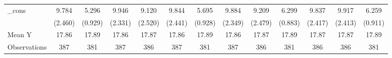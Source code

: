 {\begin{tabular}{l*{12}{c}}
\addlinespace
\_cons      &       9.784\sym{***}&       5.296\sym{***}&       9.946\sym{***}&       9.120\sym{***}&       9.844\sym{***}&       5.695\sym{***}&       9.884\sym{***}&       9.209\sym{***}&       6.299\sym{***}&       9.837\sym{***}&       9.917\sym{***}&       6.259\sym{***}\\
            &     (2.460)         &     (0.929)         &     (2.331)         &     (2.520)         &     (2.441)         &     (0.928)         &     (2.349)         &     (2.479)         &     (0.883)         &     (2.417)         &     (2.413)         &     (0.911)         \\
\midrule
Mean Y      &       17.86         &       17.89         &       17.86         &       17.87         &       17.86         &       17.89         &       17.86         &       17.87         &       17.89         &       17.87         &       17.87         &       17.89         \\
Observations&         387         &         381         &         387         &         386         &         387         &         381         &         387         &         386         &         381         &         386         &         386         &         381         \\
\bottomrule
\end{tabular}
}
